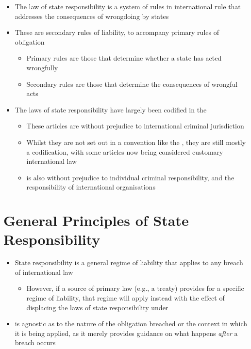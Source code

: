 \begin{itemize}
    \item The law of state responsibility is a system of rules in international rule that addresses the consequences of wrongdoing by states
    \item These are secondary rules of liability, to accompany primary rules of obligation
    \begin{itemize}
        \item Primary rules are those that determine whether a state has acted wrongfully
        \item Secondary rules are those that determine the consequences of wrongful acts
    \end{itemize}
    \item The laws of state responsibility have largely been codified in the 
    \begin{itemize}
        \item These articles are without prejudice to international criminal jurisdiction
        \item Whilst they are not set out in a convention like the , they are still mostly a codification, with some articles now being considered customary international law
        \item {} is also without prejudice to individual criminal responsibility, and the responsibility of international organisations
    \end{itemize}
\end{itemize}

\section{General Principles of State Responsibility}
\begin{itemize}
    \item State responsibility is a general regime of liability that applies to any breach of international law
    \begin{itemize}
        \item However, if a source of primary law (e.g., a treaty) provides for a specific regime of liability, that regime will apply instead with the effect of displacing the laws of state responsibility under 
    \end{itemize}
    \item {} is agnostic as to the nature of the obligation breached or the context in which it is being applied, as it merely provides guidance on what happens \textit{after} a breach occurs
\end{itemize}

